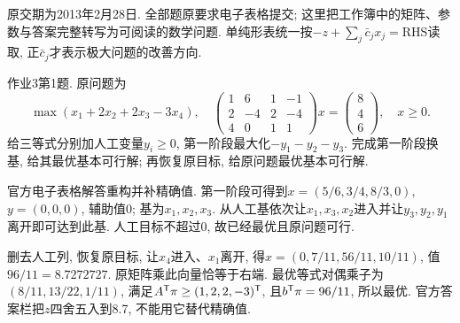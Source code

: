 原交期为2013年2月28日. 全部题原要求电子表格提交; 这里把工作簿中的矩阵、参数与答案完整转写为可阅读的数学问题. 单纯形表统一按$-z+\sum_j\bar c_jx_j=\text{RHS}$读取, 正$\bar c_j$才表示极大问题的改善方向.

\begin{exercise}\label{ass:15053-ps3-q1}
作业3第1题. 原问题为
\[
\max(x_1+2x_2+2x_3-3x_4),\quad
\begin{pmatrix}1&6&1&-1\\2&-4&2&-4\\4&0&1&1\end{pmatrix}x=
\begin{pmatrix}8\\4\\6\end{pmatrix},\quad x\ge0.
\]
给三等式分别加人工变量$y_i\ge0$, 第一阶段最大化$-y_1-y_2-y_3$. 完成第一阶段换基, 给其最优基本可行解; 再恢复原目标, 给原问题最优基本可行解.
\end{exercise}
\begin{solution}
官方电子表格解答重构并补精确值. 第一阶段可得到$x=(5/6,3/4,8/3,0)$, $y=(0,0,0)$, 辅助值0; 基为$x_1,x_2,x_3$. 从人工基依次让$x_1,x_3,x_2$进入并让$y_3,y_2,y_1$离开即可达到此基. 人工目标不超过0, 故已经最优且原问题可行.

删去人工列, 恢复原目标, 让$x_4$进入、$x_1$离开, 得$x=(0,7/11,56/11,10/11)$, 值$96/11=8.7272727$. 原矩阵乘此向量恰等于右端. 最优等式对偶乘子为$(8/11,13/22,1/11)$, 满足$A^{\mathsf T}\pi\ge(1,2,2,-3)^{\mathsf T}$, 且$b^{\mathsf T}\pi=96/11$, 所以最优. 官方答案栏把$z$四舍五入到8.7, 不能用它替代精确值.
\end{solution}

